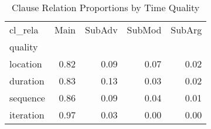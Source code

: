 \begin{table}[htbp!]
\centering
\caption{Clause Relation Proportions by Time Quality}
\label{table:rela_pr}
\begin{tabular}{lrrrr}
\toprule
cl\_rela &  Main &  SubAdv &  SubMod &  SubArg \\
quality   &       &         &         &         \\
\midrule
location  &  0.82 &    0.09 &    0.07 &    0.02 \\
duration  &  0.83 &    0.13 &    0.03 &    0.02 \\
sequence  &  0.86 &    0.09 &    0.04 &    0.01 \\
iteration &  0.97 &    0.03 &    0.00 &    0.00 \\
\bottomrule
\end{tabular}
\end{table}
